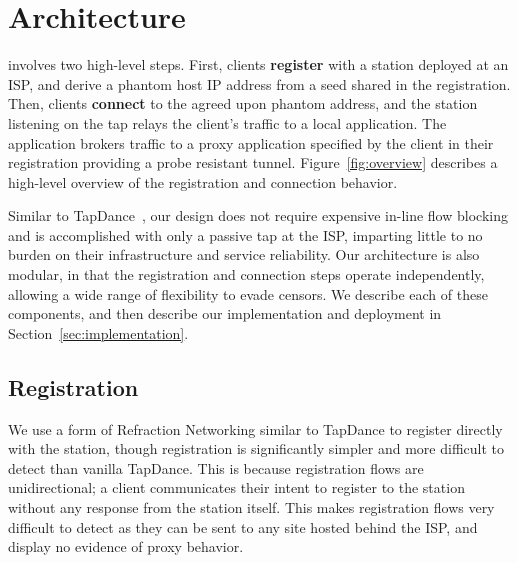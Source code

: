 \documentclass[sigconf]{acmart}
\begin{document}


\section{Architecture}
\label{sec:architecture}

\scheme involves two high-level steps. First, clients \textbf{register} with a 
\scheme station deployed at an ISP, and derive a phantom host IP address from 
a seed shared in the registration. Then, clients \textbf{connect} 
to the agreed upon phantom address, and the station listening on the tap 
relays the client's traffic to a local application. The application brokers 
traffic to a proxy application specified by the client in their registration 
providing a probe resistant tunnel. Figure~\ref{fig:overview} describes a 
high-level overview of the \scheme registration and connection behavior.

Similar to TapDance~\cite{tapdance14}, our design does not require expensive in-line
flow blocking and is accomplished with only a passive tap at the ISP, imparting
little to no burden on their infrastructure and service reliability.
Our architecture is also modular, in that the registration and connection steps operate
independently, allowing a wide range of flexibility to evade censors. We
describe each of these components, and then describe our implementation and
deployment in Section~\ref{sec:implementation}.

\FigOverview

\subsection{Registration}
\label{sec:registration}
We use a form of Refraction Networking similar to TapDance to register directly with
the station, though \scheme registration is significantly simpler and more difficult
to detect than vanilla TapDance. This is because registration flows are unidirectional; 
a client communicates their intent to register to the station without any 
response from the station itself. This makes registration flows very difficult to detect as they 
can be sent to any site hosted behind the ISP, and display no evidence of proxy behavior. 
\end{document}
